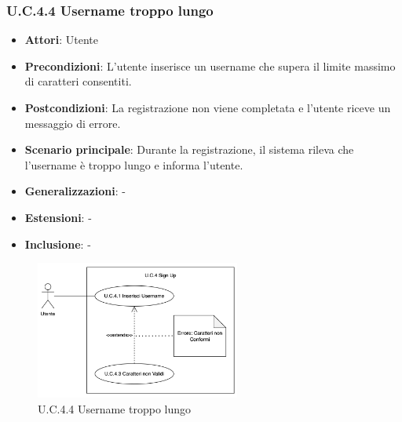 \subsubsection{U.C.4.4 Username troppo lungo}
\begin{itemize}
    \item \textbf{Attori}: Utente
    \item \textbf{Precondizioni}: L'utente inserisce un username che supera il limite massimo di caratteri consentiti.
    \item \textbf{Postcondizioni}: La registrazione non viene completata e l'utente riceve un messaggio di errore. 
    \item \textbf{Scenario principale}: Durante la registrazione, il sistema rileva che l'username è troppo lungo e informa l'utente.  
    \item \textbf{Generalizzazioni}: -
    \item \textbf{Estensioni}: -
    \item \textbf{Inclusione}: -
\end{itemize}
\begin{figure}[H]
    \centering
    \includegraphics[width=0.6\textwidth]{img/U.C.4.3.1.png}
    \caption{U.C.4.4 Username troppo lungo}
\end{figure}
\newpage

